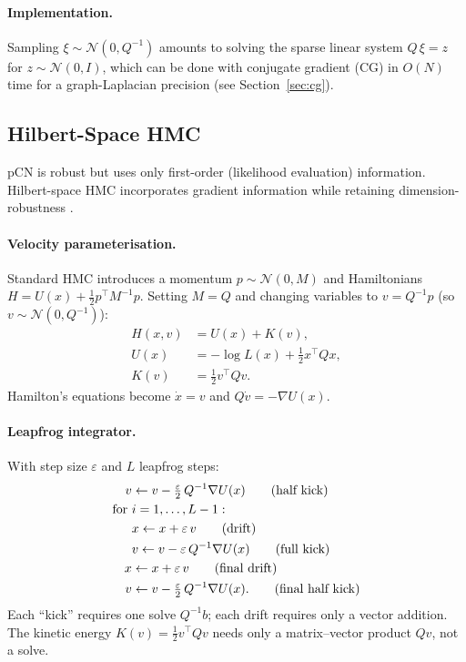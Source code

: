 \documentclass[11pt]{article}
\begin{document}
\paragraph{Implementation.}
Sampling $\xi \sim \mathcal{N}(0, Q^{-1})$ amounts to solving the sparse linear
system $Q\,\xi = z$ for $z \sim \mathcal{N}(0,I)$, which can be done with
conjugate gradient (CG) in $O(N)$ time for a graph-Laplacian precision (see
Section~\ref{sec:cg}).

\subsection{Hilbert-Space HMC}
\label{sec:hilbert-hmc}

pCN is robust but uses only first-order (likelihood evaluation) information.
Hilbert-space HMC incorporates gradient information while retaining
dimension-robustness \citep{beskos2011}.

\paragraph{Velocity parameterisation.}
Standard HMC introduces a momentum $p \sim \mathcal{N}(0, M)$ and
Hamiltonians $H = U(x) + \tfrac{1}{2}p^\top M^{-1} p$.  Setting $M = Q$
and changing variables to $v = Q^{-1}p$ (so $v \sim \mathcal{N}(0, Q^{-1})$):
\begin{align}
  H(x,v) &= U(x) + K(v), \\
  U(x)   &= -\log L(x) + \tfrac{1}{2} x^\top Q x, \label{eq:hmc-U}\\
  K(v)   &= \tfrac{1}{2} v^\top Q v. \label{eq:hmc-K}
\end{align}
Hamilton's equations become $\dot{x} = v$ and $Q\dot{v} = -\nabla U(x)$.

\paragraph{Leapfrog integrator.}
With step size $\varepsilon$ and $L$ leapfrog steps:
\begin{align}
  v &\leftarrow v - \tfrac{\varepsilon}{2}\, Q^{-1}\nabla U(x) \tag{half kick}\\
  \text{for } & i = 1,\ldots, L-1: \notag\\
  & x \leftarrow x + \varepsilon\, v \tag{drift}\\
  & v \leftarrow v - \varepsilon\, Q^{-1}\nabla U(x) \tag{full kick}\\
  x &\leftarrow x + \varepsilon\, v \tag{final drift}\\
  v &\leftarrow v - \tfrac{\varepsilon}{2}\, Q^{-1}\nabla U(x). \tag{final half kick}
\end{align}
Each ``kick'' requires one solve $Q^{-1}b$; each drift requires only a
vector addition.  The kinetic energy $K(v) = \tfrac{1}{2}v^\top Qv$ needs only
a matrix–vector product $Qv$, not a solve.
\end{document}
